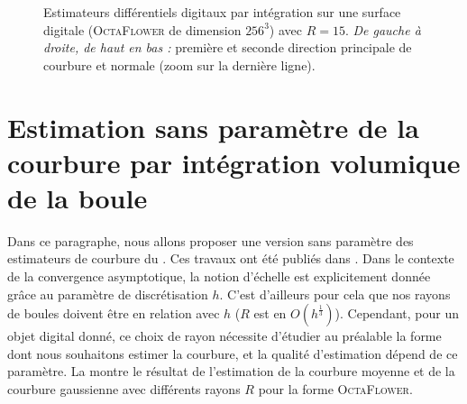 \begin{figure}[ht]
\begin{center}
\end{center}\vspace{-0.5cm}
  \caption[Estimateurs différentiels digitaux par intégration sur une surface digitale (\textsc{OctaFlower} de dimension $256^3$.]{Estimateurs différentiels digitaux par intégration sur une surface digitale (\textsc{OctaFlower} de dimension $256^3$) avec $R = 15$. \emph{De gauche à droite, de haut en bas :} première et seconde direction principale de courbure et normale (zoom sur la dernière ligne). \label{fig:digital-II-octa-2}}
\end{figure}

\section{Estimation sans paramètre de la courbure par intégration volumique de la boule}
\label{sec:curvature:parameter-free}
%
Dans ce paragraphe, nous allons proposer une version sans paramètre des
estimateurs de courbure du . Ces travaux ont
été publiés dans \cite{DGCI2014}. Dans le contexte de la convergence
asymptotique, la notion d'échelle est explicitement donnée grâce au paramètre de
discrétisation $h$. C'est d'ailleurs pour cela que nos rayons de boules doivent
être en relation avec $h$ ($R$ est en $O(h^\frac{1}{3})$). Cependant, pour un
objet digital donné, ce choix de rayon nécessite d'étudier au préalable la forme
dont nous souhaitons estimer la courbure, et la qualité d'estimation dépend de
ce paramètre. La  montre le résultat de
l'estimation de la courbure moyenne et de la courbure gaussienne avec différents
rayons $R$ pour la forme \textsc{OctaFlower}.

